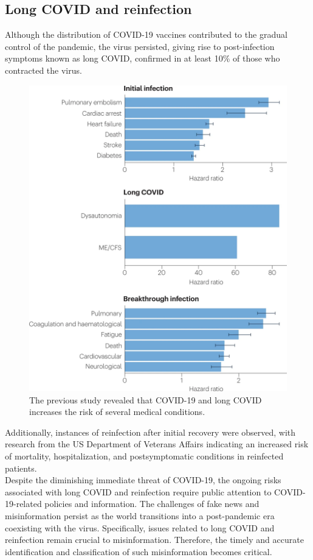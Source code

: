 \subsection{Long COVID and reinfection}
Although the distribution of COVID-19 vaccines contributed to the gradual control of the pandemic, the virus persisted, giving rise to post-infection symptoms known as long COVID, confirmed in at least 10\% of those who contracted the virus\cite{b2}. 
\begin{figure}
    \centering
    \includegraphics[width=0.75\linewidth]{img/long_COVID.png}
    \caption{The previous study revealed that COVID-19 and long COVID increases the risk of several medical conditions.\cite{b2}}
    \label{fig:long_COVID}
\end{figure}

Additionally, instances of reinfection after initial recovery were observed, with research from the US Department of Veterans Affairs indicating an increased risk of mortality, hospitalization, and postsymptomatic conditions in reinfected patients\cite{b3}.\\

Despite the diminishing immediate threat of COVID-19, the ongoing risks associated with long COVID and reinfection require public attention to COVID-19-related policies and information. The challenges of fake news and misinformation persist as the world transitions into a post-pandemic era coexisting with the virus. Specifically, issues related to long COVID and reinfection remain crucial to misinformation. Therefore, the timely and accurate identification and classification of such misinformation becomes critical.

